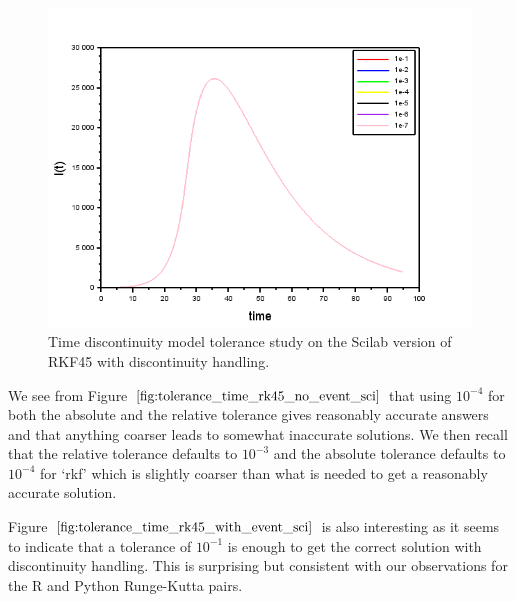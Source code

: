 \begin{figure}[H]
\centering
\includegraphics[width=0.7\linewidth]{./figures/tolerance_time_rk45_with_event_sci}
\caption{Time discontinuity model tolerance study on the Scilab version of RKF45 with discontinuity handling.}
\label{fig:tolerance_time_rk45_with_event_sci}
\end{figure}

We see from Figure $\ref{fig:tolerance_time_rk45_no_event_sci}$ that using $10^{-4}$ for both the absolute and the relative tolerance gives reasonably accurate answers and that anything coarser leads to somewhat inaccurate solutions. We then recall that the relative tolerance defaults to $10^{-3}$ and the absolute tolerance defaults to $10^{-4}$ for `rkf' which is slightly coarser than what is needed to get a reasonably accurate solution.

Figure $\ref{fig:tolerance_time_rk45_with_event_sci}$ is also interesting as it seems to indicate that a tolerance of $10^{-1}$ is enough to get the correct solution with discontinuity handling. This is surprising but consistent with our observations for the R and Python Runge-Kutta pairs.

